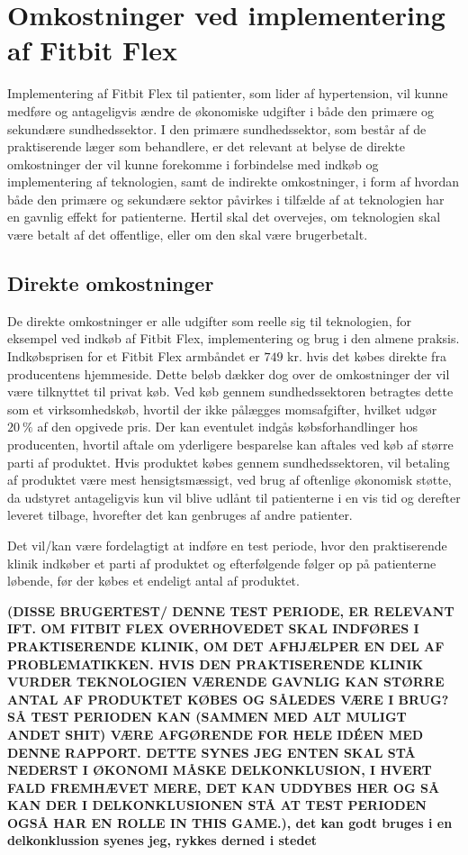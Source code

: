 
\section{Omkostninger ved implementering af Fitbit Flex}


Implementering af Fitbit Flex til patienter, som lider af hypertension, vil kunne medføre og antageligvis ændre de økonomiske udgifter i både den primære og sekundære sundhedssektor. I den primære sundhedssektor, som består af de praktiserende læger som behandlere, er det relevant at belyse de direkte omkostninger der vil kunne forekomme i forbindelse med indkøb og implementering af teknologien, samt de indirekte omkostninger, i form af hvordan både den primære og sekundære sektor påvirkes i tilfælde af at teknologien har en gavnlig effekt for patienterne. Hertil skal det overvejes, om teknologien skal være betalt af det offentlige, eller om den skal være brugerbetalt. 

\subsection{Direkte omkostninger}
De direkte omkostninger er alle  udgifter som reelle sig til teknologien, for eksempel ved indkøb af Fitbit Flex, implementering og brug i den almene praksis.  
Indkøbsprisen for et Fitbit Flex armbåndet er $749$ kr. hvis det købes direkte fra producentens hjemmeside. Dette beløb dækker dog over de omkostninger der vil være tilknyttet til privat køb. 
Ved køb gennem sundhedssektoren betragtes dette som et virksomhedskøb, hvortil der ikke pålægges momsafgifter, hvilket udgør $20~\%$ af den opgivede pris. 
Der kan eventulet indgås købsforhandlinger hos producenten, hvortil aftale om yderligere besparelse kan aftales ved køb af større parti af produktet. Hvis produktet købes gennem sundhedssektoren, vil betaling af produktet være mest hensigtsmæssigt, ved brug af oftenlige økonomisk støtte, da udstyret antageligvis kun vil blive udlånt til patienterne i en vis tid og derefter leveret tilbage, hvorefter det kan genbruges af andre patienter. 

Det vil/kan være fordelagtigt at indføre en test periode, hvor den praktiserende klinik indkøber et parti af produktet og efterfølgende følger op på patienterne løbende, før der købes et endeligt antal af produktet. 
                
\textbf{(DISSE BRUGERTEST/ DENNE TEST PERIODE, ER RELEVANT IFT. OM FITBIT FLEX OVERHOVEDET SKAL INDFØRES I PRAKTISERENDE KLINIK, OM DET AFHJÆLPER EN DEL AF PROBLEMATIKKEN. HVIS DEN PRAKTISERENDE KLINIK VURDER TEKNOLOGIEN VÆRENDE GAVNLIG KAN STØRRE ANTAL AF PRODUKTET KØBES OG SÅLEDES VÆRE I BRUG? SÅ TEST PERIODEN KAN (SAMMEN MED ALT MULIGT ANDET SHIT) VÆRE AFGØRENDE FOR HELE IDÉEN MED DENNE RAPPORT. DETTE SYNES JEG ENTEN SKAL STÅ NEDERST I ØKONOMI MÅSKE DELKONKLUSION, I HVERT FALD FREMHÆVET MERE, DET KAN UDDYBES HER OG SÅ KAN DER I DELKONKLUSIONEN STÅ AT TEST PERIODEN OGSÅ HAR EN ROLLE IN THIS GAME.), det kan godt bruges i en delkonklussion syenes jeg, rykkes derned i stedet}

